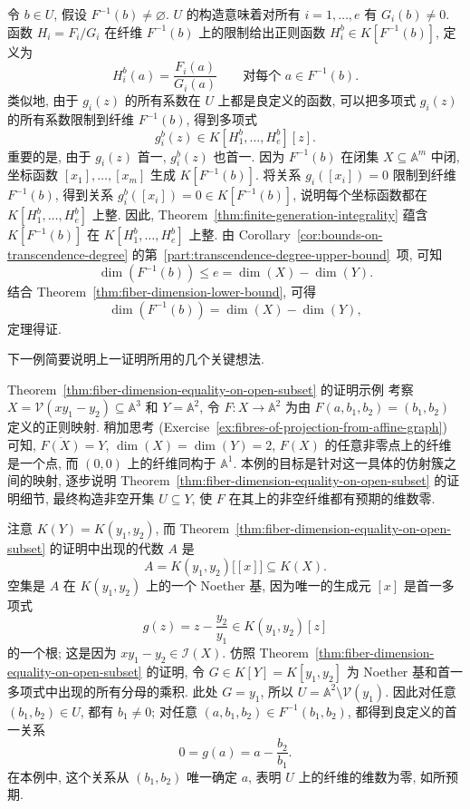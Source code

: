 \begin{Proof}
令 $b\in U$, 假设 $F^{-1}(b)\ne\varnothing$. $U$ 的构造意味着对所有 $i=1,\ldots,e$ 有 $G_{i}(b)\ne0$. 函数 $H_{i}=F_{i}/G_{i}$ 在纤维 $F^{-1}(b)$ 上的限制给出正则函数 $H_{i}^{b}\in K[F^{-1}(b)]$, 定义为
\[
  H_{i}^{b}(a)=\frac{F_{i}(a)}{G_{i}(a)}
  \qquad\text{对每个 }a\in F^{-1}(b).
\]
类似地, 由于 $g_{i}(z)$ 的所有系数在 $U$ 上都是良定义的函数, 可以把多项式 $g_{i}(z)$ 的所有系数限制到纤维 $F^{-1}(b)$, 得到多项式
\[
  g_{i}^{b}(z)\in K[H_{1}^{b},\ldots,H_{e}^{b}][z].
\]
重要的是, 由于 $g_{i}(z)$ 首一, $g_{i}^{b}(z)$ 也首一. 因为 $F^{-1}(b)$ 在闭集 $X\subseteq\mathbb{A}^{m}$ 中闭, 坐标函数 $[x_{1}],\ldots,[x_{m}]$ 生成 $K[F^{-1}(b)]$. 将关系 $g_{i}([x_{i}])=0$ 限制到纤维 $F^{-1}(b)$, 得到关系 $g_{i}^{b}([x_{i}])=0\in K[F^{-1}(b)]$, 说明每个坐标函数都在 $K[H_{1}^{b},\ldots,H_{e}^{b}]$ 上整. 因此, Theorem~\ref{thm:finite-generation-integrality} 蕴含 $K[F^{-1}(b)]$ 在 $K[H_{1}^{b},\ldots,H_{e}^{b}]$ 上整. 由 Corollary~\ref{cor:bounds-on-transcendence-degree} 的第~\ref{part:transcendence-degree-upper-bound}~项, 可知
\[
  \dim(F^{-1}(b))\le e=\dim(X)-\dim(Y).
\]
结合 Theorem~\ref{thm:fiber-dimension-lower-bound}, 可得
\[
  \dim(F^{-1}(b))=\dim(X)-\dim(Y),
\]
定理得证.
\end{Proof}

下一例简要说明上一证明所用的几个关键想法.

\begin{Example}{Theorem~\ref{thm:fiber-dimension-equality-on-open-subset} 的证明示例}\leavevmode\label{ex:fiber-dimension-equality-by-clearing-denominators}
考察 $X=\mathcal{V}(xy_{1}-y_{2})\subseteq\mathbb{A}^{3}$ 和 $Y=\mathbb{A}^{2}$, 令 $F:X\to\mathbb{A}^{2}$ 为由 $F(a,b_{1},b_{2})=(b_{1},b_{2})$ 定义的正则映射. 稍加思考 (Exercise~\ref{ex:fibres-of-projection-from-affine-graph}) 可知, $\overline{F(X)}=Y$, $\dim(X)=\dim(Y)=2$, $F(X)$ 的任意非零点上的纤维是一个点, 而 $(0,0)$ 上的纤维同构于 $\mathbb{A}^{1}$. 本例的目标是针对这一具体的仿射簇之间的映射, 逐步说明 Theorem~\ref{thm:fiber-dimension-equality-on-open-subset} 的证明细节, 最终构造非空开集 $U\subseteq Y$, 使 $F$ 在其上的非空纤维都有预期的维数零.

注意 $K(Y)=K(y_{1},y_{2})$, 而 Theorem~\ref{thm:fiber-dimension-equality-on-open-subset} 的证明中出现的代数 $A$ 是
\[
  A=K(y_{1},y_{2})\bigl[[x]\bigr]\subseteq K(X).
\]
空集是 $A$ 在 $K(y_{1},y_{2})$ 上的一个 Noether 基, 因为唯一的生成元 $[x]$ 是首一多项式
\[
  g(z)=z-\frac{y_{2}}{y_{1}}\in K(y_{1},y_{2})[z]
\]
的一个根; 这是因为 $xy_{1}-y_{2}\in\mathcal{I}(X)$. 仿照 Theorem~\ref{thm:fiber-dimension-equality-on-open-subset} 的证明, 令 $G\in K[Y]=K[y_{1},y_{2}]$ 为 Noether 基和首一多项式中出现的所有分母的乘积. 此处 $G=y_{1}$, 所以 $U=\mathbb{A}^{2}\setminus\mathcal{V}(y_{1})$. 因此对任意 $(b_{1},b_{2})\in U$, 都有 $b_{1}\ne0$; 对任意 $(a,b_{1},b_{2})\in F^{-1}(b_{1},b_{2})$, 都得到良定义的首一关系
\[
  0=g(a)=a-\frac{b_{2}}{b_{1}}.
\]
在本例中, 这个关系从 $(b_{1},b_{2})$ 唯一确定 $a$, 表明 $U$ 上的纤维的维数为零, 如所预期.
\end{Example}

